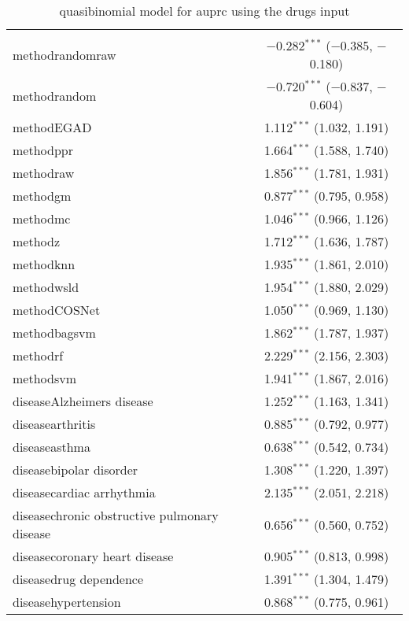 
\begin{table}[!htbp] \centering 
  \caption{quasibinomial model for auprc using the drugs input} 
  \label{} 
\begin{tabular}{@{\extracolsep{5pt}}lc} 
\\[-1.8ex]\hline 
\hline \\[-1.8ex] 
 methodrandomraw & $-$0.282$^{***}$ ($-$0.385, $-$0.180) \\ 
  methodrandom & $-$0.720$^{***}$ ($-$0.837, $-$0.604) \\ 
  methodEGAD & 1.112$^{***}$ (1.032, 1.191) \\ 
  methodppr & 1.664$^{***}$ (1.588, 1.740) \\ 
  methodraw & 1.856$^{***}$ (1.781, 1.931) \\ 
  methodgm & 0.877$^{***}$ (0.795, 0.958) \\ 
  methodmc & 1.046$^{***}$ (0.966, 1.126) \\ 
  methodz & 1.712$^{***}$ (1.636, 1.787) \\ 
  methodknn & 1.935$^{***}$ (1.861, 2.010) \\ 
  methodwsld & 1.954$^{***}$ (1.880, 2.029) \\ 
  methodCOSNet & 1.050$^{***}$ (0.969, 1.130) \\ 
  methodbagsvm & 1.862$^{***}$ (1.787, 1.937) \\ 
  methodrf & 2.229$^{***}$ (2.156, 2.303) \\ 
  methodsvm & 1.941$^{***}$ (1.867, 2.016) \\ 
  diseaseAlzheimers disease & 1.252$^{***}$ (1.163, 1.341) \\ 
  diseasearthritis & 0.885$^{***}$ (0.792, 0.977) \\ 
  diseaseasthma & 0.638$^{***}$ (0.542, 0.734) \\ 
  diseasebipolar disorder & 1.308$^{***}$ (1.220, 1.397) \\ 
  diseasecardiac arrhythmia & 2.135$^{***}$ (2.051, 2.218) \\ 
  diseasechronic obstructive pulmonary disease & 0.656$^{***}$ (0.560, 0.752) \\ 
  diseasecoronary heart disease & 0.905$^{***}$ (0.813, 0.998) \\ 
  diseasedrug dependence & 1.391$^{***}$ (1.304, 1.479) \\ 
  diseasehypertension & 0.868$^{***}$ (0.775, 0.961) \\ 

\end{tabular}
\end{table}
